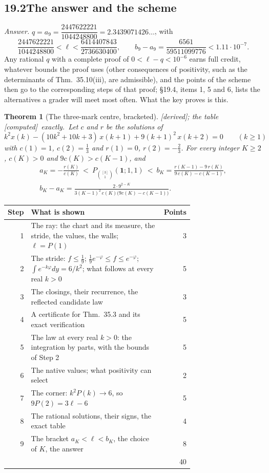 \documentclass[11pt]{article}
\newcommand{\one}{\mathbf 1}
\newcommand{\Pth}{P_{\binom{[3]}1}(\one;1,1)}
\theoremstyle{plain}
\newtheorem{theorem}[proposition]{Theorem}
\theoremstyle{definition}
\theoremstyle{remark}
\newcommand{\derived}{\textup{[derived]}}
\newcommand{\computed}{\textup{[computed]}}
\begin{document}
\subsection*{19.2\quad The answer and the scheme}

\emph{Answer.} $q=a_9=\dfrac{2447622221}{1044248800}=2.3439071426\ldots$, with
\[
\frac{2447622221}{1044248800}<\ell<\frac{6414407843}{2736630400},\qquad b_9-a_9=\frac{6561}{59511099776}<1.11\cdot10^{-7}.
\]
Any rational $q$ with a complete proof of $0<\ell-q<10^{-6}$ earns full credit, whatever bounds the proof uses (other consequences of positivity, such as the determinants of Thm.~35.10(iii), are admissible), and the points of the scheme then go to the corresponding steps of that proof; \S19.4, items 1, 5 and 6, lists the alternatives a grader will meet most often. What the key proves is this.

\begin{theorem}[The three-mark centre, bracketed]\label{t:bracket}\derived; the table \computed\ exactly.\
Let $c$ and $r$ be the solutions of
\[
k^2x(k)-(10k^2+10k+3)\,x(k+1)+9(k+1)^2\,x(k+2)=0\qquad(k\ge1)
\]
with $c(1)=1$, $c(2)=\frac13$ and $r(1)=0$, $r(2)=-\frac23$. For every integer $K\ge2$, $c(K)>0$ and $9c(K)>c(K-1)$, and
\begin{gather*}
a_K=-\frac{r(K)}{c(K)}\ <\ \Pth\ <\ b_K=\frac{r(K-1)-9\,r(K)}{9\,c(K)-c(K-1)},\\
b_K-a_K=\frac{2\cdot9^{2-K}}{3(K-1)^2\,c(K)\big(9c(K)-c(K-1)\big)} .
\end{gather*}
\end{theorem}

\begin{center}
\small
\begin{tabular}{@{}r p{0.72\linewidth} r@{}}
\toprule
Step & What is shown & Points\\ \midrule
1 & The ray: the chart and its measure, the stride, the values, the walls; $\ell=P(1)$ & 3\\
2 & The stride: $f\le\frac19$; $\frac19e^{-\varphi}\le f\le e^{-\varphi}$; $\int e^{-k\varphi}dy=6/k^2$; what follows at every real $k>0$ & 5\\
3 & The closings, their recurrence, the reflected candidate law & 3\\
4 & A certificate for Thm.~35.3 and its exact verification & 5\\
5 & The law at every real $k>0$: the integration by parts, with the bounds of Step 2 & 5\\
6 & The native values; what positivity can select & 2\\
7 & The corner: $k^2P(k)\to6$, so $9P(2)=3\ell-6$ & 5\\
8 & The rational solutions, their signs, the exact table & 4\\
9 & The bracket $a_K<\ell<b_K$, the choice of $K$, the answer & 8\\ \midrule
& & 40\\
\bottomrule
\end{tabular}
\end{center}
\end{document}
